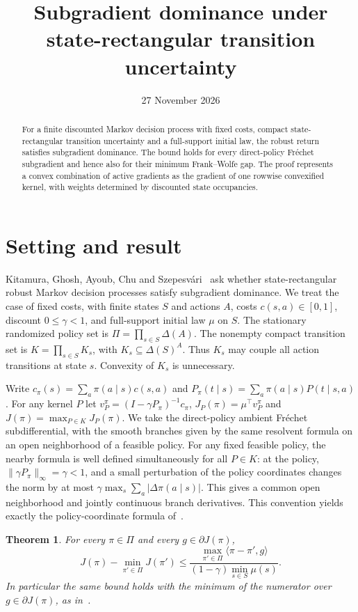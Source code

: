 \documentclass[11pt]{amsart}
\title{Subgradient dominance under state-rectangular transition uncertainty}
\date{27 November 2026}
\newtheorem{theorem}{Theorem}
\begin{document}
\begin{abstract}
For a finite discounted Markov decision process with fixed costs, compact state-rectangular transition uncertainty and a full-support initial law, the robust return satisfies subgradient dominance. The bound holds for every direct-policy Fr\'echet subgradient and hence also for their minimum Frank--Wolfe gap. The proof represents a convex combination of active gradients as the gradient of one rowwise convexified kernel, with weights determined by discounted state occupancies.
\end{abstract}
\maketitle

\section{Setting and result}
Kitamura, Ghosh, Ayoub, Chu and Szepesv\'ari~\cite[\S5]{K} ask whether state-rectangular robust Markov decision processes satisfy subgradient dominance. We treat the case of fixed costs, with finite states \(S\) and actions \(A\), costs \(c(s,a)\in[0,1]\), discount \(0\leq\gamma<1\), and full-support initial law \(\mu\) on \(S\). The stationary randomized policy set is \(\Pi=\prod_{s\in S}\Delta(A)\). The nonempty compact transition set is \(K=\prod_{s\in S}K_s\), with \(K_s\subseteq\Delta(S)^A\). Thus \(K_s\) may couple all action transitions at state \(s\). Convexity of \(K_s\) is unnecessary.

Write \(c_\pi(s)=\sum_a\pi(a\mid s)c(s,a)\) and \(P_\pi(t\mid s)=\sum_a\pi(a\mid s)P(t\mid s,a)\). For any kernel \(P\) let \(v_P^\pi=(I-\gamma P_\pi)^{-1}c_\pi\), \(J_P(\pi)=\mu^\top v_P^\pi\) and \(J(\pi)=\max_{P\in K}J_P(\pi)\). We take the direct-policy ambient Fr\'echet subdifferential, with the smooth branches given by the same resolvent formula on an open neighborhood of a feasible policy. For any fixed feasible policy, the nearby formula is well defined simultaneously for all \(P\in K\): at the policy, \(\|\gamma P_\pi\|_\infty=\gamma<1\), and a small perturbation of the policy coordinates changes the norm by at most \(\gamma\max_s\sum_a|\Delta\pi(a\mid s)|\). This gives a common open neighborhood and jointly continuous branch derivatives. This convention yields exactly the policy-coordinate formula of~\cite[Lemma~2.1]{K}.

\begin{theorem}
For every \(\pi\in\Pi\) and every \(g\in\partial J(\pi)\),
\[
 J(\pi)-\min_{\pi'\in\Pi}J(\pi')
 \leq
 \frac{\max_{\pi'\in\Pi}\langle\pi-\pi',g\rangle}
      {(1-\gamma)\min_{s\in S}\mu(s)}.
\]
In particular the same bound holds with the minimum of the numerator over \(g\in\partial J(\pi)\), as in~\cite[Definition~3.1]{K}.
\end{theorem}
\end{document}
